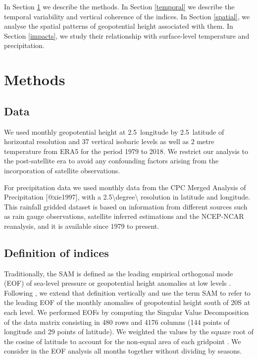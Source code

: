 \documentclass[smallextended]{svjour3}       %
\begin{document}
In Section \ref{methods} we describe the methods.
In Section \ref{temporal} we describe the temporal variability and vertical coherence of the indices.
In Section \ref{spatial}, we analyse the spatial patterns of geopotential height associated with them.
In Section \ref{impacts}, we study their relationship with surface-level temperature and precipitation.

\hypertarget{methods}{%
\section{Methods}\label{methods}}

\hypertarget{data}{%
\subsection{Data}\label{data}}

We used monthly geopotential height at 2.5\degree~longitude by 2.5\degree~latitude of horizontal resolution and 37 vertical isobaric levels as well as 2 metre temperature from ERA5 \citep{hersbach2020} for the period 1979 to 2018.
We restrict our analysis to the post-satellite era to avoid any confounding factors arising from the incorporation of satellite observations.

For precipitation data we used monthly data from the CPC Merged Analysis of Precipitation {[}@xie1997{]}, with a 2.5\textbackslash degree\textbackslash{} resolution in latitude and longitude.
This rainfall gridded dataset is based on information from different sources such as rain gauge observations, satellite inferred estimations and the NCEP-NCAR reanalysis, and it is available since 1979 to present.

\hypertarget{definition-of-indices}{%
\subsection{Definition of indices}\label{definition-of-indices}}

Traditionally, the SAM is defined as the leading empirical orthogonal mode (EOF) of sea-level pressure or geopotential height anomalies at low levels \citep{ho2012}.
Following \citet{baldwin2001}, we extend that definition vertically and use the term SAM to refer to the leading EOF of the monthly anomalies of geopotential height south of 20\degree S at each level.
We performed EOFs by computing the Singular Value Decomposition of the data matrix consisting in 480 rows and 4176 columns (144 points of longitude and 29 points of latitude).
We weighted the values by the square root of the cosine of latitude to account for the non-equal area of each gridpoint \citep{chung1999}.
We consider in the EOF analysis all months together without dividing by seasons.
\end{document}
